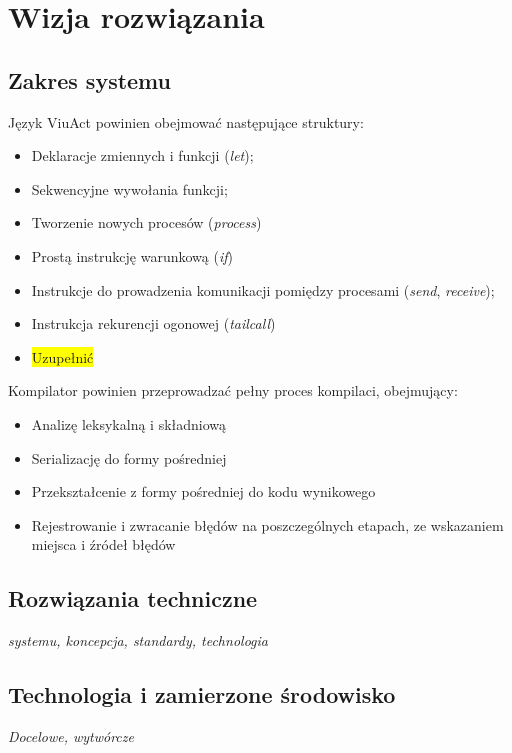 \documentclass[11pt,oneside,a4paper,titlepage,onecolumn]{article}
\begin{document}
\section{Wizja rozwiązania}

\subsection{Zakres systemu}

Język ViuAct powinien obejmować następujące struktury:

\begin{itemize}
	\item Deklaracje zmiennych i funkcji (\emph{let});
	\item Sekwencyjne wywołania funkcji;
	\item Tworzenie nowych procesów (\emph{process})
	\item Prostą instrukcję warunkową (\emph{if})
	\item Instrukcje do prowadzenia komunikacji pomiędzy procesami (\emph{send}, \emph{receive});
	\item Instrukcja rekurencji ogonowej (\emph{tailcall})
	\item \colorbox{yellow}{Uzupełnić}
\end{itemize}

Kompilator powinien przeprowadzać pełny proces kompilaci, obejmujący:
\begin{itemize}
	\item Analizę leksykalną i składniową
	\item Serializację do formy pośredniej
	\item Przekształcenie z formy pośredniej do kodu wynikowego
	\item Rejestrowanie i zwracanie błędów na poszczególnych etapach, ze wskazaniem miejsca i źródeł błędów
\end{itemize}

\subsection{Rozwiązania techniczne}

\emph{systemu, koncepcja, standardy, technologia}

\subsection{Technologia i zamierzone środowisko}

\emph{Docelowe, wytwórcze}
\end{document}
